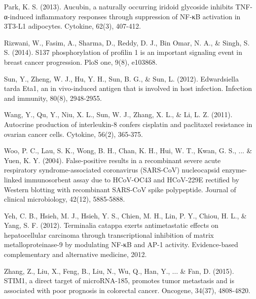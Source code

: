 \documentclass{article}
\begin{document}
Park, K. S. (2013). Aucubin, a naturally occurring iridoid glycoside inhibits TNF-α-induced inflammatory responses through suppression of NF-κB activation in 3T3-L1 adipocytes. Cytokine, 62(3), 407-412.

Rizwani, W., Fasim, A., Sharma, D., Reddy, D. J., Bin Omar, N. A., \& Singh, S. S. (2014). S137 phosphorylation of profilin 1 is an important signaling event in breast cancer progression. PloS one, 9(8), e103868.

Sun, Y., Zheng, W. J., Hu, Y. H., Sun, B. G., \& Sun, L. (2012). Edwardsiella tarda Eta1, an in vivo-induced antigen that is involved in host infection. Infection and immunity, 80(8), 2948-2955.

Wang, Y., Qu, Y., Niu, X. L., Sun, W. J., Zhang, X. L., \& Li, L. Z. (2011). Autocrine production of interleukin-8 confers cisplatin and paclitaxel resistance in ovarian cancer cells. Cytokine, 56(2), 365-375.

Woo, P. C., Lau, S. K., Wong, B. H., Chan, K. H., Hui, W. T., Kwan, G. S., ... \& Yuen, K. Y. (2004). False-positive results in a recombinant severe acute respiratory syndrome-associated coronavirus (SARS-CoV) nucleocapsid enzyme-linked immunosorbent assay due to HCoV-OC43 and HCoV-229E rectified by Western blotting with recombinant SARS-CoV spike polypeptide. Journal of clinical microbiology, 42(12), 5885-5888.

Yeh, C. B., Hsieh, M. J., Hsieh, Y. S., Chien, M. H., Lin, P. Y., Chiou, H. L., \& Yang, S. F. (2012). Terminalia catappa exerts antimetastatic effects on hepatocellular carcinoma through transcriptional inhibition of matrix metalloproteinase-9 by modulating NF-κB and AP-1 activity. Evidence-based complementary and alternative medicine, 2012.

Zhang, Z., Liu, X., Feng, B., Liu, N., Wu, Q., Han, Y., ... \& Fan, D. (2015). STIM1, a direct target of microRNA-185, promotes tumor metastasis and is associated with poor prognosis in colorectal cancer. Oncogene, 34(37), 4808-4820.
\end{document}
